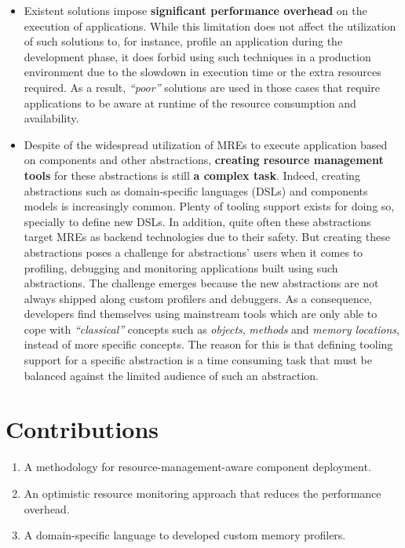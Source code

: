 \begin{itemize}
\item Existent solutions impose \textbf{significant performance overhead} on the execution of applications.
While this limitation does not affect the utilization of such solutions to, for instance, profile an application during the development phase, it does forbid using such techniques in a production environment due to the slowdown in execution time or the extra resources required.
As a result, \textit{``poor''} solutions are used in those cases that require applications to be aware at runtime of the resource consumption and availability.

\item Despite of the widespread utilization of MREs to execute application based on components and other abstractions, \textbf{creating resource management tools} for these abstractions is still \textbf{a complex task}.
Indeed, creating abstractions such as domain-specific languages (DSLs) and components models is increasingly common.
Plenty of tooling support exists for doing so, specially to define new DSLs.
In addition, quite often these abstractions target MREs as backend technologies due to their safety.
But creating these abstractions poses a challenge for abstractions' users when it comes to profiling, debugging and monitoring applications built using such abstractions.
The challenge emerges because the new abstractions are not always shipped along custom profilers and debuggers.
As a consequence, developers find themselves using mainstream tools which are only able to cope with \textit{``classical''} concepts such as \textit{objects}, \textit{methods} and \textit{memory locations}, instead of more specific concepts.
The reason for this is that defining tooling support for a specific abstraction is a time consuming task that must be balanced against the limited audience of such an abstraction.
\end{itemize}
 
\section{Contributions}

\begin{enumerate}
\item A methodology for resource-management-aware component deployment.
\item An optimistic resource monitoring approach that reduces the performance overhead.
\item A domain-specific language to developed custom memory profilers.
\end{enumerate}
